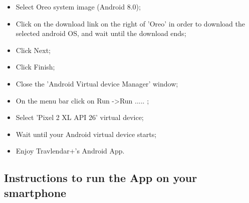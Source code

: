 \begin{itemize}
	\item Select Oreo system image (Android 8.0);
	\item Click on the download link on the right of 'Oreo' in order to download the selected android OS, and wait until the download ends; 
	\item Click Next;
	\item Click Finish;
	\item Close the 'Android Virtual device Manager' window;
	\item On the menu bar click on Run -\textgreater Run ..... ;
	\item Select 'Pixel 2 XL API 26' virtual device;
	\item Wait until your Android virtual device starts;
	\item Enjoy Travlendar+'s Android App.	
\end{itemize}

\subsection{Instructions to run the App on your smartphone}
\label{subsect:Smartphone Instructions}
